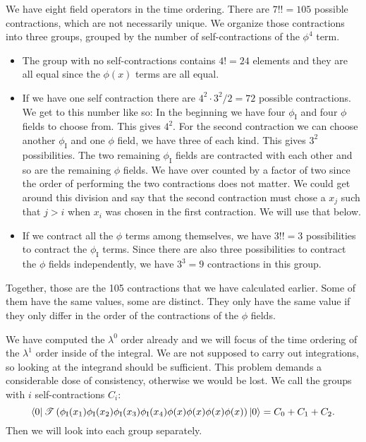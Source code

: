 \documentclass[11pt, english, fleqn, DIV=15, headinclude, BCOR=1cm]{scrartcl}
\newcommand\timeorder{\mathscr T}
\begin{document}
We have eight field operators in the time ordering. There are $7!! =
105$ possible contractions, which are not necessarily unique. We
organize those contractions into three groups, grouped by the number of
self-contractions of the $\phi^4$ term.

\begin{itemize}
    \item 
        The group with no self-contractions contains $4! = 24$ elements and
        they are all equal since the $\phi(x)$ terms are all equal.

    \item
        If we have one self contraction there are $4^2 \cdot 3^2 / 2 = 72$
        possible contractions. We get to this number like so: In the beginning
        we have four $\phi_\mathrm I$ and four $\phi$ fields to choose from.
        This gives $4^2$. For the second contraction we can choose another
        $\phi_\mathrm I$ and one $\phi$ field, we have three of each kind. This
        gives $3^2$ possibilities. The two remaining $\phi_\mathrm I$ fields
        are contracted with each other and so are the remaining $\phi$ fields.
        We have over counted by a factor of two since the order of performing
        the two contractions does not matter. We could get around this division
        and say that the second contraction must chose a $x_j$ such that $j >
        i$ when $x_i$ was chosen in the first contraction. We will use that
        below.

    \item
        If we contract all the $\phi$ terms among themselves, we have $3!! = 3$
        possibilities to contract the $\phi_\mathrm I$ terms. Since there are
        also three possibilities to contract the $\phi$ fields independently,
        we have $3^3 = 9$ contractions in this group.
\end{itemize}

Together, those are the 105 contractions that we have calculated earlier. Some
of them have the same values, some are distinct. They only have the same value
if they only differ in the order of the contractions of the $\phi$ fields.

We have computed the $\lambda^0$ order already and we will focus of the time
ordering of the $\lambda^1$ order inside of the integral. We are not supposed
to carry out integrations, so looking at the integrand should be sufficient.
This problem demands a considerable dose of consistency, otherwise we would be
lost. We call the groups with $i$ self-contractions $C_i$:
\[
    \bra 0
    \timeorder\del{
        \phi_\mathrm I(x_1)
        \phi_\mathrm I(x_2)
        \phi_\mathrm I(x_3)
        \phi_\mathrm I(x_4)
        \phi(x) \phi(x) \phi(x) \phi(x)
    }
    \ket 0
    = C_0 + C_1 + C_2.
\]
Then we will look into each group separately.
\end{document}
